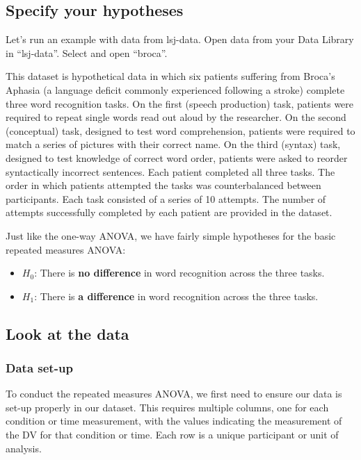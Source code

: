 \documentclass[
]{book}
\providecommand{\tightlist}{%
  \setlength{\itemsep}{0pt}\setlength{\parskip}{0pt}}
\begin{document}
\hypertarget{specify-your-hypotheses-5}{%
\subsection{Specify your hypotheses}\label{specify-your-hypotheses-5}}

Let's run an example with data from lsj-data. Open data from your Data Library in ``lsj-data''. Select and open ``broca''.

This dataset is hypothetical data in which six patients suffering from Broca's Aphasia (a language deficit commonly experienced following a stroke) complete three word recognition tasks. On the first (speech production) task, patients were required to repeat single words read out aloud by the researcher. On the second (conceptual) task, designed to test word comprehension, patients were required to match a series of pictures with their correct name. On the third (syntax) task, designed to test knowledge of correct word order, patients were asked to reorder syntactically incorrect sentences. Each patient completed all three tasks. The order in which patients attempted the tasks was counterbalanced between participants. Each task consisted of a series of 10 attempts. The number of attempts successfully completed by each patient are provided in the dataset.

Just like the one-way ANOVA, we have fairly simple hypotheses for the basic repeated measures ANOVA:

\begin{itemize}
\tightlist
\item
  \(H_0\): There is \textbf{no difference} in word recognition across the three tasks.
\item
  \(H_1\): There is \textbf{a difference} in word recognition across the three tasks.
\end{itemize}

\hypertarget{look-at-the-data-7}{%
\subsection{Look at the data}\label{look-at-the-data-7}}

\hypertarget{data-set-up-7}{%
\subsubsection{Data set-up}\label{data-set-up-7}}

To conduct the repeated measures ANOVA, we first need to ensure our data is set-up properly in our dataset. This requires multiple columns, one for each condition or time measurement, with the values indicating the measurement of the DV for that condition or time. Each row is a unique participant or unit of analysis.
\end{document}
